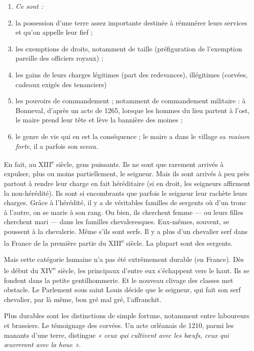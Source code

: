 \documentclass[french,twoside]{book} %
\newlength{\listmod}
\newcommand{\listhead}[1]{\hspace{-1\listmod}\emph{#1}}
\newcommand{\labelchar}[1]{{\color{rubric}\bf #1}}
\begin{document}
\begin{enumerate}[itemsep=0pt,]
\item[]\listhead{Ce sont :}
\item la possession d’une terre assez importante destinée à rémunérer leurs services et qu’on appelle leur fief ;
\item les exemptions de droits, notamment de taille (préfiguration de l’exemption pareille des officiers royaux) ;
\item les gains de leurs charges légitimes (part des  
\label{p62} redevances), illégitimes (corvées, cadeaux exigés des tenanciers)
\item les pouvoirs de commandement ; notamment de commandement militaire : à Bonneval, d’après un acte de 1265, lorsque les hommes du lieu partent à l’ost, le maire prend leur tête et lève la bannière des moines ;
\item le genre de vie qui en est la conséquence ; le maire a dans le village sa \emph{maison forte}, il a parfois son sceau.

\end{enumerate}\noindent En fait, au XIII\textsuperscript{e} siècle, gens puissants. Ils ne sont que rarement arrivés à expulser, plus ou moins partiellement, le seigneur. Mais ils sont arrivés à peu près partout à rendre leur charge en fait héréditaire (si en droit, les seigneurs affirment la non-hérédité). Ils sont si encombrants que parfois le seigneur leur rachète leurs charges. Grâce à l’hérédité, il y a de véritables familles de sergents où d’un tronc à l’autre, on se marie à son rang. Ou bien, ils cherchent femme — ou leurs filles cherchent mari — dans les familles chevaleresques. Eux-mêmes, souvent, se poussent à la chevalerie. Même s’ils sont serfs. Il y a plus d’un chevalier serf dans la France de la première partie du XIII\textsuperscript{e} siècle. La plupart sont des sergents.\par
Mais cette catégorie humaine n’a pas été extrêmement durable (en France). Dès le début du XIV\textsuperscript{e} siècle, les principaux d’entre eux s’échappent vers le haut. Ils se fondent dans la petite gentilhommerie. Et le nouveau clivage des classes met obstacle. Le Parlement sous saint Louis décide que le seigneur, qui fait son serf chevalier, par là même, bon gré mal gré, l’affranchit.\par
\bigbreak
\noindent \labelchar{b)} Plus durables sont les distinctions de simple fortune, notamment entre laboureurs et brassiers. Le témoignage des corvées. Un acte orléanais de 1210, parmi les manants d’une terre, distingue \emph{« ceux qui cultivent avec les bœufs, ceux qui œuvreront avec la houe »}.
\end{document}
